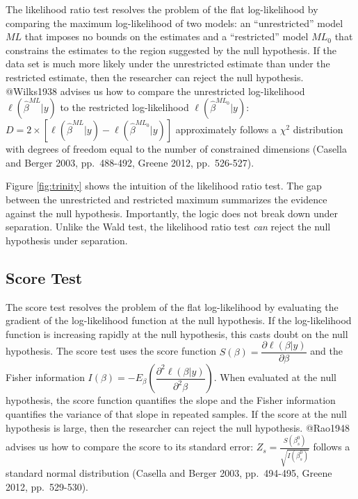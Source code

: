 \documentclass[
]{article}
\begin{document}
The likelihood ratio test resolves the problem of the flat
log-likelihood by comparing the maximum log-likelihood of two models: an
``unrestricted'' model \(ML\) that imposes no bounds on the estimates
and a ``restricted'' model \(ML_0\) that constrains the estimates to the
region suggested by the null hypothesis. If the data set is much more
likely under the unrestricted estimate than under the restricted
estimate, then the researcher can reject the null hypothesis. @Wilks1938
advises us how to compare the unrestricted log-likelihood
\(\ell(\hat{\beta}^{ML} | y)\) to the restricted log-likelihood
\(\ell(\hat{\beta}^{ML_0} | y)\):
\(D = 2 \times \left[ \ell(\hat{\beta}^{ML} | y) - \ell(\hat{\beta}^{ML_0} | y) \right]\)
approximately follows a \(\chi^2\) distribution with degrees of freedom
equal to the number of constrained dimensions (Casella and Berger 2003,
pp.~488-492, Greene 2012, pp.~526-527).

Figure \ref{fig:trinity} shows the intuition of the likelihood ratio
test. The gap between the unrestricted and restricted maximum summarizes
the evidence against the null hypothesis. Importantly, the logic does
not break down under separation. Unlike the Wald test, the likelihood
ratio test \emph{can} reject the null hypothesis under separation.

\hypertarget{score-test}{%
\subsection{Score Test}\label{score-test}}

The score test resolves the problem of the flat log-likelihood by
evaluating the gradient of the log-likelihood function at the null
hypothesis. If the log-likelihood function is increasing rapidly at the
null hypothesis, this casts doubt on the null hypothesis. The score test
uses the score function
\(S(\beta) = \dfrac{\partial \ell(\beta | y)}{\partial \beta}\) and the
Fisher information
\(I(\beta) = -E_\beta \left( \dfrac{\partial^2 \ell(\beta | y)}{\partial^2 \beta} \right)\).
When evaluated at the null hypothesis, the score function quantifies the
slope and the Fisher information quantifies the variance of that slope
in repeated samples. If the score at the null hypothesis is large, then
the researcher can reject the null hypothesis. @Rao1948 advises us how
to compare the score to its standard error:
\(Z_s = \frac{S(\beta^0_s)}{\sqrt{I(\beta^0_s)}}\) follows a standard
normal distribution (Casella and Berger 2003, pp.~494-495, Greene 2012,
pp.~529-530).
\end{document}
